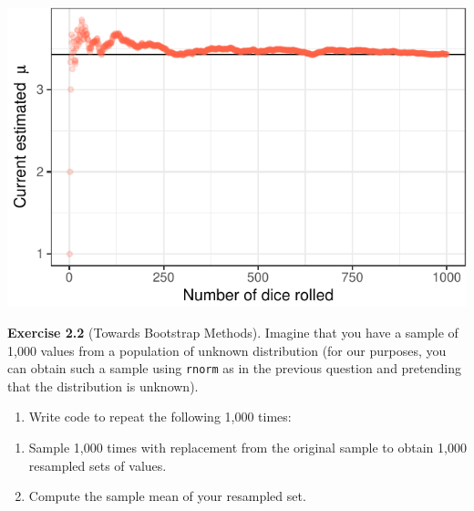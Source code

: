 \documentclass[]{article}
\providecommand{\tightlist}{%
  \setlength{\itemsep}{0pt}\setlength{\parskip}{0pt}}
\begin{document}
\begin{center}\includegraphics{exercises_files/figure-latex/unnamed-chunk-1-2} \end{center}

\textbf{Exercise 2.2} (Towards Bootstrap Methods). Imagine that you have
a sample of 1,000 values from a population of unknown distribution (for
our purposes, you can obtain such a sample using \texttt{rnorm} as in
the previous question and pretending that the distribution is unknown).

\begin{enumerate}
\def\labelenumi{\arabic{enumi}.}
\tightlist
\item
  Write code to repeat the following 1,000 times:
\end{enumerate}

\begin{enumerate}
\def\labelenumi{(\alph{enumi})}
\tightlist
\item
  Sample 1,000 times with replacement from the original sample to obtain
  1,000 resampled sets of values.
\item
  Compute the sample mean of your resampled set.
\end{enumerate}
\end{document}
